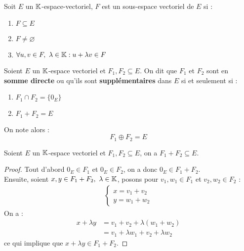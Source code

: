 \begin{definition}
	Soit $E$ un $\mathbb{K}$-espace-vectoriel, $F$ est un sous-espace vectoriel de $E$ si :
	\begin{enumerate}
    		\item $F \subseteq E$
    		\item $F \neq \varnothing$
    		\item $\forall u, v \in F,\ \lambda \in \mathbb{K} : u + \lambda v \in F$
    	\end{enumerate}
\end{definition}

\begin{definition}
	Soient $E$ un $\mathbb{K}$-espace vectoriel et $F_1, F_2 \subseteq E$. On dit que $F_1$ et $F_2$ sont en \textbf{somme directe} ou qu'ils sont \textbf{supplémentaires} dans $E$ si et seulement si :
	\begin{multicols}{2}
	    \begin{enumerate}
		\item $F_1 \cap F_2 = \{ 0_E \}$
		\item $F_1 + F_2 = E$
	\end{enumerate}
	\end{multicols}
	On note alors :
	\[ F_1 \oplus F_2 = E \]
\end{definition}

\begin{proposition}
	Soient $E$ un $\mathbb{K}$-espace vectoriel et $F_1, F_2 \subseteq E$, on a $F_1 + F_2 \subseteq E$. 
\end{proposition}

\begin{proof}
	Tout d'abord $0_E \in F_1$ et $0_E \in F_2$, on a donc $0_E \in F_1 + F_2$.
	\\
	Ensuite, soient $x, y \in F_1 + F_2,\ \lambda \in \mathbb{K}$, posons pour $v_1, w_1 \in F_1$ et $v_2, w_2 \in F_2$ :
	\begin{align*}
		\begin{cases}
			x = v_1 + v_2 \\
			y = w_1 + w_2
		\end{cases}
	\end{align*}
	On a :
	\begin{align*}
		x + \lambda y &= v_1 + v_2 + \lambda (w_1 + w_2) \\
		&= v_1 + \lambda w_1 + v_2 + \lambda w_2
	\end{align*}
	ce qui implique que $x + \lambda y \in F_1 + F_2$.
\end{proof}

